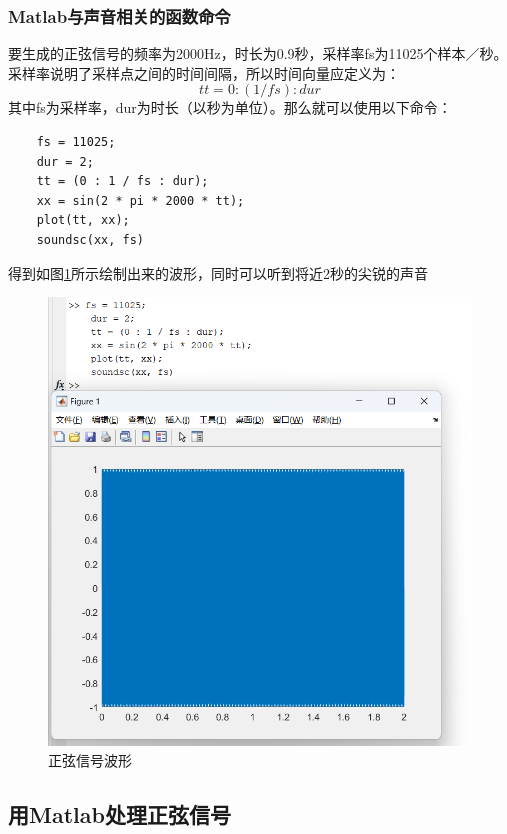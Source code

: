 \documentclass[UTF8]{ctexart}
\begin{document}
\subsubsection{Matlab与声音相关的函数命令}
要生成的正弦信号的频率为2000Hz，时长为0.9秒，采样率fs为11025个样本／秒。
采样率说明了采样点之间的时间间隔，所以时间向量应定义为：
$$
    tt=0:(1/fs):dur
$$
其中fs为采样率，dur为时长（以秒为单位）。那么就可以使用以下命令：
\begin{verbatim}
    fs = 11025;
    dur = 2;
    tt = (0 : 1 / fs : dur);
    xx = sin(2 * pi * 2000 * tt);
    plot(tt, xx);
    soundsc(xx, fs)
\end{verbatim}
得到如图\ref{img:sin_wave}所示绘制出来的波形，同时可以听到将近2秒的尖锐的声音
\begin{figure}[htbp]
    \centering
    \includegraphics[width=0.6\linewidth]{sin_wave.png}
    \caption{正弦信号波形}
    \label{img:sin_wave}
\end{figure}

\subsection{用Matlab处理正弦信号}
\end{document}
